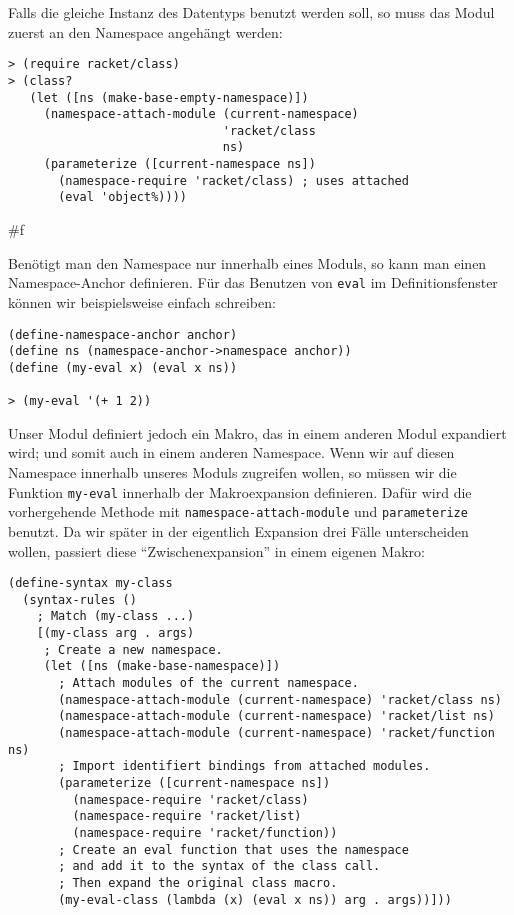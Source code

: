Falls die gleiche Instanz des Datentyps benutzt werden soll, so muss das Modul zuerst an den Namespace angehängt werden:

\begin{lstlisting}
> (require racket/class)
> (class?
   (let ([ns (make-base-empty-namespace)])
     (namespace-attach-module (current-namespace)
                              'racket/class
                              ns)
     (parameterize ([current-namespace ns])
       (namespace-require 'racket/class) ; uses attached
       (eval 'object%))))
\end{lstlisting}
{\routput \#f}

Benötigt man den Namespace nur innerhalb eines Moduls, so kann man einen Namespace-Anchor definieren. Für das Benutzen von \texttt{eval} im Definitionsfenster können wir beispielsweise einfach schreiben:

\begin{lstlisting}
(define-namespace-anchor anchor)
(define ns (namespace-anchor->namespace anchor))
(define (my-eval x) (eval x ns))

> (my-eval '(+ 1 2))
\end{lstlisting}
{}

Unser Modul definiert jedoch ein Makro, das in einem anderen Modul expandiert wird; und somit auch in einem anderen Namespace. Wenn wir auf diesen Namespace innerhalb unseres Moduls zugreifen wollen, so müssen wir die Funktion \texttt{my-eval} innerhalb der Makroexpansion definieren. Dafür wird die vorhergehende Methode mit \texttt{namespace-attach-module} und \texttt{parameterize} benutzt. Da wir später in der eigentlich Expansion drei Fälle unterscheiden wollen, passiert diese ``Zwischenexpansion'' in einem eigenen Makro:

\begin{lstlisting}
(define-syntax my-class
  (syntax-rules ()
    ; Match (my-class ...)
    [(my-class arg . args)
     ; Create a new namespace.
     (let ([ns (make-base-namespace)])
       ; Attach modules of the current namespace.
       (namespace-attach-module (current-namespace) 'racket/class ns)
       (namespace-attach-module (current-namespace) 'racket/list ns)
       (namespace-attach-module (current-namespace) 'racket/function ns)
       ; Import identifiert bindings from attached modules.
       (parameterize ([current-namespace ns])
         (namespace-require 'racket/class)
         (namespace-require 'racket/list)
         (namespace-require 'racket/function))
       ; Create an eval function that uses the namespace
       ; and add it to the syntax of the class call.
       ; Then expand the original class macro.
       (my-eval-class (lambda (x) (eval x ns)) arg . args))]))
\end{lstlisting}

